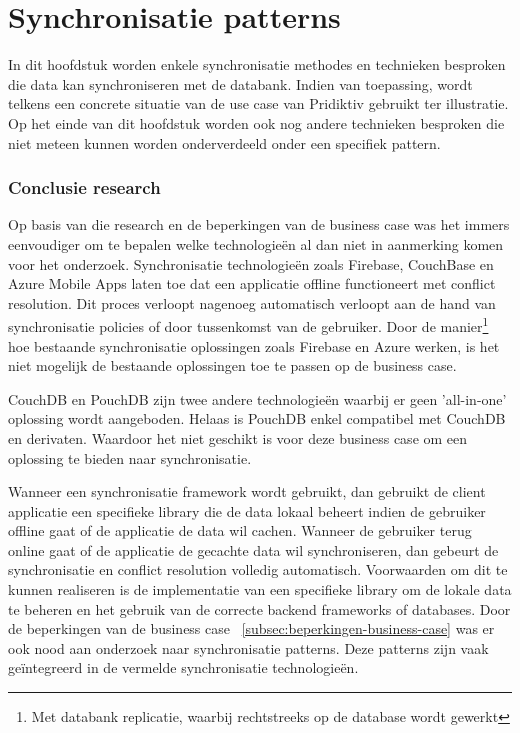 
\chapter{Synchronisatie patterns}
\label{ch:synchronisatiemethdodes}


In dit hoofdstuk worden enkele synchronisatie methodes en technieken besproken die data kan synchroniseren met de databank. Indien van toepassing, wordt telkens een concrete situatie van de use case van Pridiktiv gebruikt ter illustratie. Op het einde van dit hoofdstuk worden ook nog andere technieken besproken die niet meteen kunnen worden onderverdeeld onder een specifiek pattern.

\subsection{Conclusie research}
Op basis van die research en de beperkingen van de business case was het immers eenvoudiger om te bepalen welke technologie\"en al dan niet in aanmerking komen voor het onderzoek. Synchronisatie technologie\"en zoals Firebase, CouchBase en Azure Mobile Apps laten toe dat een applicatie offline functioneert met conflict resolution. Dit proces verloopt nagenoeg automatisch verloopt aan de hand van synchronisatie policies of door tussenkomst van de gebruiker. Door de manier\footnote{Met databank replicatie, waarbij rechtstreeks op de database wordt gewerkt} hoe bestaande synchronisatie oplossingen zoals Firebase en Azure werken, is het niet mogelijk de bestaande oplossingen toe te passen op de business case. 

CouchDB en PouchDB zijn twee andere technologie\"en waarbij er geen 'all-in-one' oplossing wordt aangeboden. Helaas is PouchDB enkel compatibel met CouchDB en derivaten. Waardoor het niet geschikt is voor deze business case om een oplossing te bieden naar synchronisatie.

Wanneer een synchronisatie framework wordt gebruikt, dan gebruikt de client applicatie een specifieke library die de data lokaal beheert indien de gebruiker offline gaat of de applicatie de data wil cachen. Wanneer de gebruiker terug online gaat of de applicatie de gecachte data wil synchroniseren, dan gebeurt de synchronisatie en conflict resolution volledig automatisch. Voorwaarden om dit te kunnen realiseren is de implementatie van een specifieke library om de lokale data te beheren en het gebruik van de correcte backend frameworks of databases.
Door de beperkingen van de business case ~\ref{subsec:beperkingen-business-case} was er ook nood aan onderzoek naar synchronisatie patterns. Deze patterns zijn vaak ge\"integreerd in de vermelde synchronisatie technologie\"en.

